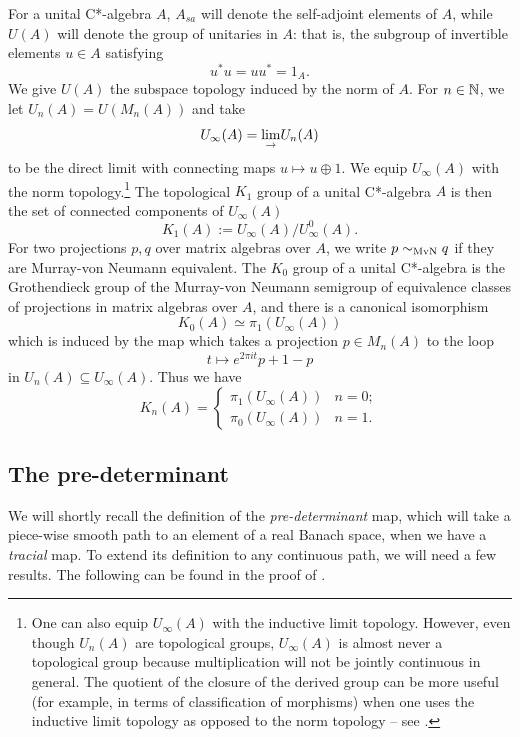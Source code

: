 \documentclass{amsart}
\begin{document}
For a unital C*-algebra $A$, $A_{sa}$ will denote the self-adjoint elements of $A$, while $U(A)$ will denote the group of unitaries in $A$: that is, the subgroup of invertible elements $u \in A$ satisfying
\begin{equation}
u^*u = uu^* = 1_A.
\end{equation}
We give $U(A)$ the subspace topology induced by the norm of $A$. 
For $n \in \mathbb{N}$, we let $U_n(A) = U(M_n(A))$ and take
\begin{equation}
U_{\infty}(A) = \underset{\to}{\lim} U_n(A)
\end{equation}
to be the direct limit with connecting maps $u \mapsto u \oplus 1$.
We equip $U_{\infty}(A)$ with the norm topology.\footnote{One can also equip $U_{\infty}(A)$ with the inductive limit topology. However, even though $U_n(A)$ are topological groups, $U_{\infty}(A)$ is almost never a topological group because multiplication will not be jointly continuous in general. The quotient of the closure of the derived group can be more useful (for example, in terms of classification of morphisms) when one uses the inductive limit topology as opposed to the norm topology -- see \cite{Thomsen95,NielsenThomsen96,CGSTW23}.}
The topological $K_1$ group of a unital C*-algebra $A$ is then the set of connected components of $U_{\infty}(A)$
\begin{equation}
K_1(A) := U_{\infty}(A)/U_{\infty}^0(A).
\end{equation}
For two projections $p,q$ over matrix algebras over $A$, we write $p \sim_{\text{MvN}} q$ if they are Murray-von Neumann equivalent. 
The $K_0$ group of a unital C*-algebra is the Grothendieck group of the Murray-von Neumann semigroup of equivalence classes of projections in matrix algebras over $A$, and there is a canonical isomorphism
\begin{equation}
K_0(A) \simeq \pi_1(U_{\infty}(A))
\end{equation}
which is induced by the map which takes a projection $p \in M_n(A)$ to the loop
\begin{equation}
t \mapsto e^{2\pi i t}p + 1-p
\end{equation}
in $U_n(A) \subseteq U_{\infty}(A)$.
Thus we have
\begin{equation}
K_n(A) = \begin{cases}
\pi_1(U_{\infty}(A)) & n =0; \\
\pi_0(U_{\infty}(A)) & n =1.
\end{cases}
\end{equation}


\subsection{The pre-determinant}
We will shortly recall the definition of the \emph{pre-determinant} map, which will take a piece-wise smooth path to an element of a real Banach space, when we have a \emph{tracial} map.
To extend its definition to any continuous path, we will need a few results.
The following can be found in the proof of \cite[Lemma 3]{dlHS84a}.
\end{document}
